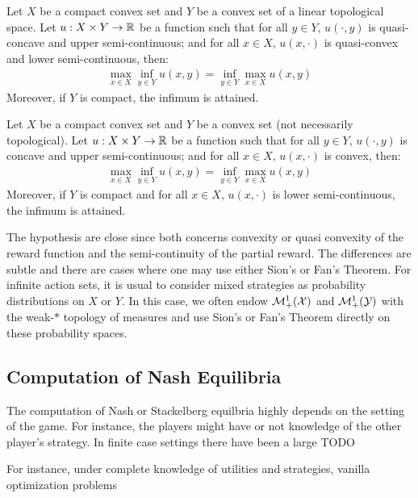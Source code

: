 \begin{thm}
Let $X$ be a compact convex set and $Y$ be a convex set of a linear topological space. Let $u:X\times Y\to\mathbb{R}$ be a function such that for all $y\in Y$, $u(\cdot,y)$ is quasi-concave and upper semi-continuous; and for all $x\in X$, $u(x,\cdot)$ is quasi-convex and lower semi-continuous, then:
\begin{align*}
    \max_{x\in X}\inf_{y\in Y} u(x,y) = \inf_{y\in Y}\max_{x\in X} u(x,y)
\end{align*}
Moreover, if $Y$ is compact, the infimum is attained.
\end{thm}



\begin{thm}
Let $X$ be a compact convex set and $Y$ be a convex set (not necessarily topological). Let $u:X\times Y\to\mathbb{R}$ be a function such that for all $y\in Y$, $u(\cdot,y)$ is concave and upper semi-continuous; and for all $x\in X$, $u(x,\cdot)$ is convex, then:
\begin{align*}
    \max_{x\in X}\inf_{y\in Y} u(x,y) = \inf_{y\in Y}\max_{x\in X} u(x,y)
\end{align*}
Moreover, if $Y$ is compact and for all $x\in X$, $u(x,\cdot)$ is lower semi-continuous, the infimum is attained.
\end{thm}

The hypothesis are close since both concerns convexity or quasi convexity of the reward function and the semi-continuity of the partial reward. The differences are subtle and there are cases where one may use either Sion's or Fan's Theorem. For infinite action sets, it is usual to consider mixed strategies as probability distributions on $X$ or $Y$. In this case, we often endow $\mathcal{M}^1_+(\mathcal{X})$ and $\mathcal{M}^1_+(\mathcal{Y})$ with the weak-$*$ topology of measures and use Sion's or Fan's Theorem directly on these probability spaces.

\subsection{Computation of Nash Equilibria}

The computation of Nash or Stackelberg equilbria highly depends on the setting of the game. For instance, the players might have or not knowledge of the other player's strategy. In finite case settings there have been a large  TODO

For instance, under complete knowledge of utilities and strategies, vanilla optimization problems 


